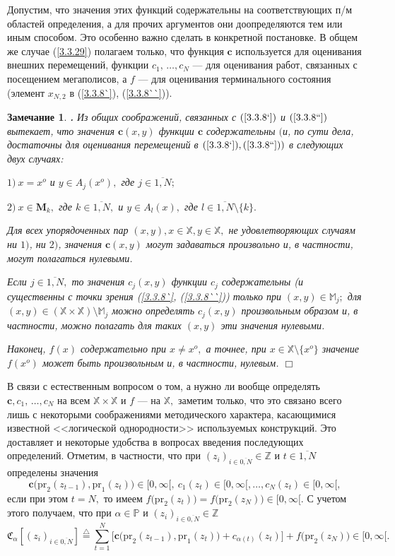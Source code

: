 \documentclass[11pt,twoside,openany]{report}
\newcommand{\bfn}{\begin{equation}}
\newcommand{\efn}{\end{equation}}
\newcommand{\df}{\stackrel{\triangle}{=}}
\newcommand{\ov}{\overline}
\newcounter{theo}
\newcounter{zam}
\newtheorem{zam}{Замечание}[section]
\newcommand{\TL}{\mbox{\bf{$\!\!$.}}}
\newcommand{\al}{\alpha}
\newcommand{\sm}{\setminus}
\newcommand{\bbz}{{\mathbb Z}}
\newcommand{\bbm}{{\mathbb M}}
\newcommand{\bbx}{{\mathbb X}}
\newcommand{\bbp}{{\mathbb P}}
\begin{document}
Допустим, что значения этих функций содержательны на соответствующих п/м
областей определения, а для прочих аргументов они доопределяются тем или иным
способом.
Это особенно важно сделать в конкретной постановке.
В общем же случае
(\ref{3.3.29})  полагаем только, что функция $\mathbf{c}$
используется для оценивания внешних перемещений,
функции $c_1,\,\ldots,c_N$ --- для оценивания работ,
связанных с посещением мегаполисов,
а $f$ --- для оценивания терминального состояния (элемент
$x_{N,2}$
в (\ref{3.3.8`}), (\ref{3.3.8``})).

\begin{zam}
  \label{z3.3.3}{\TL}
Из общих соображений, связанных с $(\ref{3.3.8`})$ и
$(\ref{3.3.8``})$ вытекает,
что значения $\mathbf{c}(x,y)$ функции $\mathbf{c}$
содержательны
$($и, по сути дела, достаточны для оценивания перемещений в
$(\ref{3.3.8`}), (\ref{3.3.8``}))$
в следующих двух случаях:

$1)\ x = x^o$ и $y\in A_j(x^o),$ где $j\in \ov{1,N};$

$2)\ x\in \mathbf{M}_k,$ где $k\in \ov{1,N},$ и $y\in A_l(x),$ где
$l\in \ov{1,N}\sm\{k\}.$

Для всех упорядоченных пар $(x,y), x\in \bbx, y\in \bbx,$ не удовлетворяющих
случаям
ни $1)$, ни $2)$,
значения $\mathbf{c}(x,y)$ могут задаваться произвольно и,
в частности, могут полагаться нулевыми.

Если $j\in\ov{1,N},$
то значения $c_j(x,y)$  функции $c_j$ содержательны
(и существенны с точки зрения (\ref{3.3.8`}, (\ref{3.3.8``}))
только при $(x,y) \in \bbm_j;$
для $(x,y)\in (\bbx\times \bbx)\sm \bbm_j$ можно определять
$c_j(x,y)$ произвольным образом и, в частности, можно полагать
для таких $(x,y)$ эти значения нулевыми.

Наконец,
$f(x)$ содержательно при $x\neq x^o,$
а точнее, при
$x\in \bbx\sm \{x^o\}$
значение$f(x^o)$  может быть произвольным и, в частности, нулевым.
\hfill $\Box$
\end{zam}

В связи с естественным вопросом о том, а нужно ли вообще определять
$\mathbf{c},c_1,\,\ldots,c_N$
на всем $\bbx \times \bbx$ и $f$ --- на $\bbx,$
заметим только, что это связано всего лишь с некоторыми соображениями методического
характера,
касающимися известной <<логической однородности>> используемых конструкций.
Это доставляет и некоторые удобства в вопросах введения последующих определений.
Отметим, в частности, что при
$(z_i)_{i\in\ov{0,N}}\in \bbz$ и $t\in \ov{1,N}$
определены значения
$$
  \mathbf{c}\bigl(\mathrm{pr}_2(z_{t-1}),\mathrm{pr}_1(z_t)\bigl)\in
  [0,\infty[, \ c_1(z_t)\in [0,\infty[,\ldots,c_N(z_t)\in [0,\infty[
  ,
$$
если при этом $t = N,$
то имеем
$f\bigl(\mathrm{pr}_2(z_t)\bigl) = f\bigl(\mathrm{pr}_2(z_N)\bigl)\in [0,\infty[.$
С учетом этого получаем,
что при
$\al\in \bbp$ и $(z_i)_{i\in\ov{0,N}}\in \bbz$
\bfn
  \label{3.3.30}
  \mathfrak{C}_\al[(z_i)_{i\in\ov{0,N}}] \df
  \sum\limits_{t=1}^N\bigl[\mathbf{c}\bigl(\mathrm{pr}_2(z_{t-1}),
  \mathrm{pr}_1(z_t)\bigl) + c_{\al(t)}(z_t)\bigl] + f\bigl(\mathrm{pr}_2(z_N)
  \bigl) \in [0,\infty[.
\efn
\end{document}
